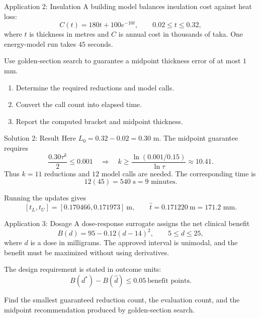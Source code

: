 \documentclass[aspectratio=169,11pt,t]{beamer}
\begin{document}
\begin{frame}{Application 2: Insulation}
  A building model balances insulation cost against heat loss:
  \[
    C(t)=180t+100e^{-10t},
    \qquad 0.02\le t\le0.32,
  \]
  where \(t\) is thickness in metres and \(C\) is annual cost in thousands of
  taka. One energy-model run takes \(45\) seconds.

  Use golden-section search to guarantee a midpoint thickness error of at most
  \(1\) mm.

  \begin{enumerate}
    \item Determine the required reductions and model calls.
    \item Convert the call count into elapsed time.
    \item Report the computed bracket and midpoint thickness.
  \end{enumerate}
\end{frame}

\begin{frame}{Solution 2: Result}
  Here \(L_0=0.32-0.02=0.30\) m. The midpoint guarantee requires
  \[
    \frac{0.30\tau^k}{2}\le0.001
    \quad\Longrightarrow\quad
    k\ge\frac{\ln(0.001/0.15)}{\ln\tau}\approx10.41.
  \]
  Thus \(\boxed{k=11}\) reductions and \(\boxed{12}\) model calls are needed.
  The corresponding time is
  \[
    12(45)=540\text{ s}=\boxed{9\text{ minutes}}.
  \]

  Running the updates gives
  \[
    [t_L,t_U]=[0.170466,0.171973]\ \text{m},
    \qquad \widehat t=0.171220\ \text{m}=\boxed{171.2\text{ mm}}.
  \]

\end{frame}

\begin{frame}{Application 3: Dosage}
  A dose-response surrogate assigns the net clinical benefit
  \[
    B(d)=95-0.12(d-14)^2,
    \qquad 5\le d\le25,
  \]
  where \(d\) is a dose in milligrams. The approved interval is unimodal, and
  the benefit must be maximized without using derivatives.

  The design requirement is stated in outcome units:
  \[
    B(d^*)-B(\widehat d)\le0.05\ \text{benefit points}.
  \]

  Find the smallest guaranteed reduction count, the evaluation count, and the
  midpoint recommendation produced by golden-section search.
\end{frame}
\end{document}
